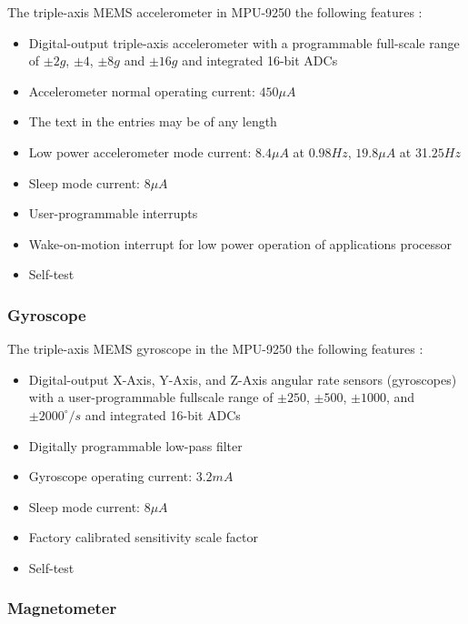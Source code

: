 The triple-axis MEMS accelerometer in MPU-9250 the following features \cite{mpu9250specification}:

\begin{itemize}
    \item Digital-output triple-axis accelerometer with a programmable full-scale range  of $\pm 2g$, $\pm 4$, $\pm 8g$ and $\pm 16g$ and integrated 16-bit ADCs
    \item Accelerometer normal operating current: $450 \mu A$
    \item The text in the entries may be of any length
    \item Low power accelerometer mode current: $8.4 \mu A$ at $0.98Hz$, $19.8 \mu A$ at 31.$25Hz$
    \item Sleep mode current: $8 \mu A$
    \item User-programmable interrupts
    \item Wake-on-motion interrupt for low power operation of applications processor
    \item Self-test
\end{itemize}



\subsubsection{Gyroscope}

The triple-axis MEMS gyroscope in the MPU-9250 the following features \cite{mpu9250specification}:

\begin{itemize}
    \item Digital-output X-Axis, Y-Axis, and Z-Axis angular rate sensors (gyroscopes) with a user-programmable fullscale range of $\pm 250$, $\pm 500$, $\pm 1000$, and $\pm 2000^{\circ}/s$ and integrated 16-bit ADCs
    \item Digitally programmable low-pass filter
    \item Gyroscope operating current: $3.2mA$
    \item Sleep mode current: $8 \mu A$
    \item Factory calibrated sensitivity scale factor
    \item Self-test
\end{itemize}



\subsubsection{Magnetometer}

